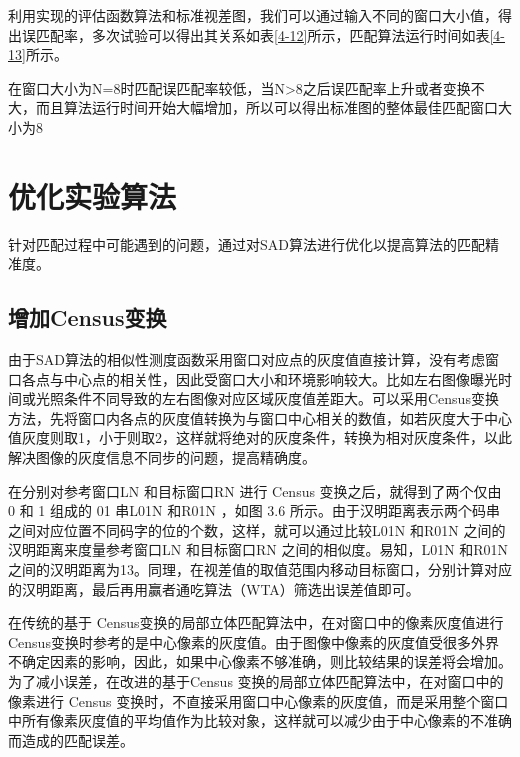 利用实现的评估函数算法和标准视差图，我们可以通过输入不同的窗口大小值，得出误匹配率，多次试验可以得出其关系如表\ref{4-12}所示，匹配算法运行时间如表\ref{4-13}所示。


在窗口大小为N=8时匹配误匹配率较低，当N>8之后误匹配率上升或者变换不大，而且算法运行时间开始大幅增加，所以可以得出标准图的整体最佳匹配窗口大小为8

\section{优化实验算法}

针对匹配过程中可能遇到的问题，通过对SAD算法进行优化以提高算法的匹配精准度。

\subsection{增加Census变换}


由于SAD算法的相似性测度函数采用窗口对应点的灰度值直接计算，没有考虑窗口各点与中心点的相关性，因此受窗口大小和环境影响较大。比如左右图像曝光时间或光照条件不同导致的左右图像对应区域灰度值差距大。可以采用Census变换方法，先将窗口内各点的灰度值转换为与窗口中心相关的数值，如若灰度大于中心值灰度则取1，小于则取2，这样就将绝对的灰度条件，转换为相对灰度条件，以此解决图像的灰度信息不同步的问题，提高精确度。


在分别对参考窗口LN 和目标窗口RN 进行 Census 变换之后，就得到了两个仅由 0 和 1 组成的 01 串L01N 和R01N ，如图 3.6 所示。由于汉明距离表示两个码串之间对应位置不同码字的位的个数，这样，就可以通过比较L01N 和R01N 之间的汉明距离来度量参考窗口LN 和目标窗口RN 之间的相似度。易知，L01N 和R01N 之间的汉明距离为13。同理，在视差值的取值范围内移动目标窗口，分别计算对应的汉明距离，最后再用赢者通吃算法（WTA）筛选出误差值即可。

在传统的基于 Census变换的局部立体匹配算法中，在对窗口中的像素灰度值进行 Census变换时参考的是中心像素的灰度值。由于图像中像素的灰度值受很多外界不确定因素的影响，因此，如果中心像素不够准确，则比较结果的误差将会增加。为了减小误差，在改进的基于Census 变换的局部立体匹配算法中，在对窗口中的像素进行 Census 变换时，不直接采用窗口中心像素的灰度值，而是采用整个窗口中所有像素灰度值的平均值作为比较对象，这样就可以减少由于中心像素的不准确而造成的匹配误差。 

